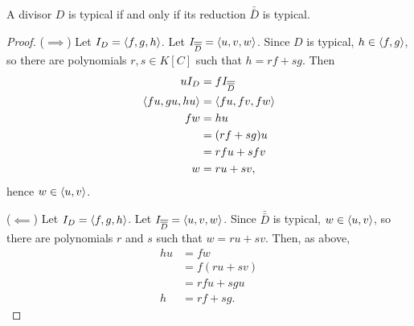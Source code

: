 \begin{theorem}
  \label{thm_typical_divisors_and_reduction}
  A divisor $D$ is typical if and only if its reduction $\bar{\bar D}$ is typical.
\end{theorem}
\begin{proof}
  ($\implies$)
  Let $I_D = \left\langle f, g, h \right\rangle$.
  Let $I_{\overline{\overline D}} = \left\langle u, v, w \right\rangle$.
  Since $D$ is typical, $h \in \left\langle f, g \right\rangle$,
  so there are polynomials $r, s \in K[C]$ such that $h = rf + sg$. Then
  \begin{align*}
    uI_D &= fI_{\overline{\overline D}} \\
    \left\langle fu, gu, hu \right\rangle &= \left\langle fu, fv, fw \right\rangle \\
    fw &= hu \\
       &= (rf + sg)u \\
       &= rfu + sfv \\
     w &= ru + sv,
  \end{align*}
  hence $w \in \left\langle u,v \right\rangle$.

  ($\impliedby$)
  Let $I_D = \left\langle f, g, h \right\rangle$.
  Let $I_{\overline{\overline D}} = \left\langle u, v, w \right\rangle$.
  Since $\bar{\bar D}$ is typical, $w \in \left\langle u, v \right\rangle$,
  so there are polynomials $r$ and $s$ such that $w = ru + sv$. Then, as above,
  \begin{align*}
    hu &= fw \\
       &= f(ru + sv) \\
       &= rfu + sgu \\
     h &= rf + sg.
  \end{align*}
\end{proof}

